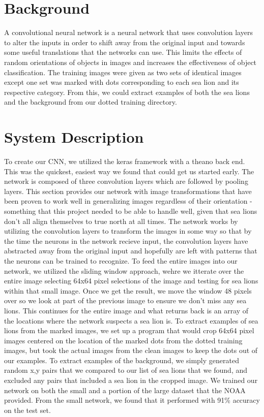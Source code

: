 \documentclass[letterpaper]{article}
\begin{document}
\section{Background}
A convolutional neural network is a neural network that uses convolution layers to alter the inputs in order to shift away from the original input and towards some useful translations that the networks can use. This limits the effects of random orientations of objects in images and increases the effectiveness of object classification.
The training images were given as two sets of identical images except one set was marked with dots corresponding to each sea lion and its respective category. From this, we could extract examples of both the sea lions and the background from our dotted training directory.

\section{System Description}
To create our CNN, we utilized the keras framework with a theano back end. This was the quickest, easiest way we found that could get us started early. The network is composed of three convolution layers which are followed by pooling layers. This section provides our network with image transformations that have been proven to work well in generalizing images regardless of their orientation - something that this project needed to be able to handle well, given that sea lions don't all align themselves to true north at all times. The network works by utilizing the convolution layers to transform the images in some way so that by the time the neurons in the network recieve input, the convolution layers have abstracted away from the original input and hopefully are left with patterns that the neurons can be trained to recognize.
To feed the entire images into our network, we utilized the sliding window approach, wehre we itterate over the entire image selecting 64x64 pixel selections of the image and testing for sea lions within that small image. Once we get the result, we move the window 48 pixels over so we look at part of the previous image to ensure we don't miss any sea lions. This continues for the entire image and what returns back is an array of the locations where the network suspects a sea lion is.
To extract examples of sea lions from the marked images, we set up a program that would crop 64x64 pixel images centered on the location of the marked dots from the dotted training images, but took the actual images from the clean images to keep the dots out of our examples. To extract examples of the background, we simply generated random x,y pairs that we compared to our list of sea lions that we found, and excluded any pairs that included a sea lion in the cropped image.
We trained our network on both the small and a portion of the large dataset that the NOAA provided. From the small network, we found that it performed with 91\% accuracy on the test set.
\end{document}
